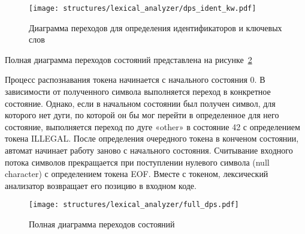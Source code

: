\begin{figure}[ht]
	\centering
	\vspace{\toppaddingoffigure}
	\texttt{[image: structures/lexical\_analyzer/dps\_ident\_kw.pdf]}
	\caption{Диаграмма переходов для определения идентификаторов и ключевых слов}
	\label{f:dps_ident_kw}
\end{figure}

Полная диаграмма переходов состояний представлена на рисунке~\ref{f:full_dps}

Процесс распознавания токена начинается с начального состояния 0.
В зависимости от полученного символа выполняется переход в конкретное состояние.
Однако, если в начальном состоянии был получен символ, для которого нет дуги,
по которой он бы мог перейти в определенное для него состояние, выполняется переход по дуге «other» в состояние 42 с определением токена ILLEGAL.
После определения очередного токена в конченом состоянии, автомат начинает работу заново с начального состояния.
Считывание входного потока символов прекращается при поступлении нулевого символа (null character) с определением токена EOF.
Вместе с токеном, лексический анализатор возвращает его позицию в входном коде.


\clearpage

\begin{figure}[h!]
	\centering
	\vspace{\toppaddingoffigure}
	\texttt{[image: structures/lexical\_analyzer/full\_dps.pdf]}
	\caption{Полная диаграмма переходов состояний}
	\label{f:full_dps}
\end{figure}

\clearpage